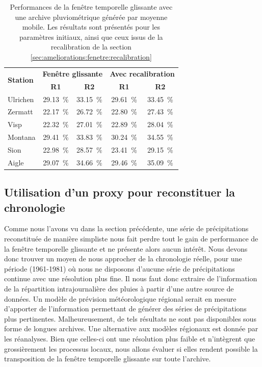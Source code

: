 \documentclass[hess]{copernicus}
\begin{document}
\begin{table}[htb]
	\caption{Performances de la fenêtre temporelle glissante avec une archive pluviométrique générée par moyenne mobile. Les résultats sont présentés pour les paramètres initiaux, ainsi que ceux issus de la recalibration de la section \ref{sec:ameliorations:fenetre:recalibration}}
	\begin{center}
		\begin{tabular*}{10cm}{@{\extracolsep{\fill}}lcccc}
			\hline
			\multirow{2}{*}{\textbf{Station}} & \multicolumn{ 2}{c}{\textbf{Fenêtre glissante}} & \multicolumn{ 2}{c}{\textbf{Avec recalibration}} \\
			& \multicolumn{1}{c}{\textbf{R1}} & \multicolumn{1}{c}{\textbf{R2}} & \multicolumn{1}{c}{\textbf{R1}} & \multicolumn{1}{c}{\textbf{R2}} \\ \hline
			Ulrichen & 29.13~\% & 33.15~\% & 29.61~\% & 33.45~\% \\ \hline
			Zermatt & 22.17~\% & 26.72~\% & 22.80~\% & 27.43~\% \\ \hline
			Visp & 22.32~\% & 27.01~\% & 22.89~\% & 28.04~\% \\ \hline
			Montana & 29.41~\% & 33.83~\% & 30.24~\% & 34.55~\% \\ \hline
			Sion & 22.98~\% & 28.57~\% & 23.41~\% & 29.15~\% \\ \hline
			Aigle & 29.07~\% & 34.66~\% & 29.46~\% & 35.09~\% \\ \hline
		\end{tabular*}
	\end{center}
	\label{tab:fenetre_glissante:Resultats_moyenne_mobile}
\end{table}



\subsection{Utilisation d'un proxy pour reconstituer la chronologie}

Comme nous l'avons vu dans la section précédente, une série de précipitations reconstituée de manière simpliste nous fait perdre tout le gain de performance de la fenêtre temporelle glissante et ne présente alors aucun intérêt. Nous devons donc trouver un moyen de nous approcher de la chronologie réelle, pour une période (1961-1981) où nous ne disposons d'aucune série de précipitations continue avec une résolution plus fine. Il nous faut donc extraire de l'information de la répartition intrajournalière des pluies à partir d'une autre source de données. Un modèle de prévision météorologique régional serait en mesure d'apporter de l'information permettant de générer des séries de précipitations plus pertinentes. Malheureusement, de tels résultats ne sont pas disponibles sous forme de longues archives. Une alternative aux modèles régionaux est donnée par les réanalyses. Bien que celles-ci ont une résolution plus faible et n'intègrent que grossièrement les processus locaux, nous allons évaluer si elles rendent possible la transposition de la fenêtre temporelle glissante sur toute l'archive. 
\end{document}
